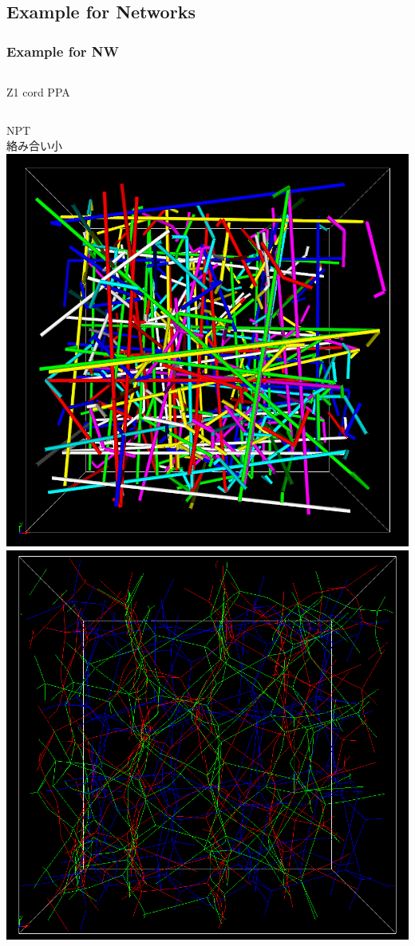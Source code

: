 \documentclass[12pt, dvipdfmx]{beamer}
\begin{document}
\subsection{Example for Networks}
\begin{frame}
    \frametitle{Example for NW}
    \begin{columns}[T, onlytextwidth]
        \centering
            Z1 cord
        \centering
            PPA
    \end{columns}
    \begin{columns}[c, onlytextwidth]
        NPT\\
        絡み合い小
        \centering
            \includegraphics[width=.8\textwidth]{z_cord_NPT_4Chain.png}
        \centering
            \includegraphics[width=.8\textwidth]{NPT_PPA.png}

\end{columns}
\end{frame}
\end{document}

